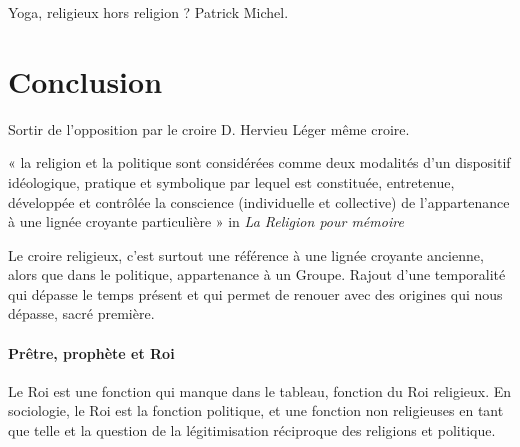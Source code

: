       \begin{Ex}
          Yoga, religieux hors religion ? Patrick Michel.
      \end{Ex}
      
      \section{Conclusion}
      
      Sortir de l’opposition par le croire D. Hervieu Léger même croire. 
      
      \begin{Def}[Le croire]
         « la religion et la politique sont considérées comme deux modalités d’un dispositif idéologique, pratique et symbolique par lequel est constituée, entretenue, développée et contrôlée la conscience (individuelle et collective) de l’appartenance à une lignée croyante particulière » in \textit{La Religion pour mémoire }
      \end{Def}   

Le croire religieux, c'est surtout une référence à une lignée croyante ancienne, alors que dans le politique, appartenance à un Groupe. Rajout d'une temporalité qui dépasse le temps présent et qui permet de renouer avec des origines qui nous dépasse, sacré première. 

\paragraph{Prêtre, prophète et Roi} Le Roi est une fonction qui manque dans le tableau, fonction du Roi religieux. En sociologie, le Roi est la fonction politique, et une fonction non religieuses en tant que telle et la question de la légitimisation réciproque des religions et politique.


 